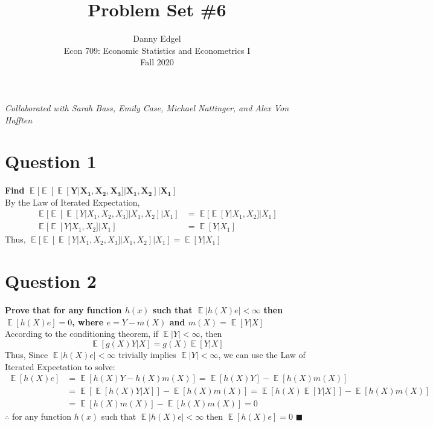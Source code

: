 \documentclass{article}
\DeclareMathOperator{\E}{\mathbb{E}}%
\begin{document}
\title{	Problem Set \#6 }
\author{ 	Danny Edgel 										\\ 
			Econ 709: Economic Statistics and Econometrics I	\\
			Fall 2020											\\
		}
\maketitle\thispagestyle{empty}


\noindent\textit{Collaborated with Sarah Bass, Emily Case, Michael Nattinger, and Alex Von Hafften}

\section*{Question 1}
\textbf{Find} $\mathbf{\E[\E[\E[Y|X_1,X_2,X_3]|X_1,X_2]|X_1]}$
\bigskip \\
By the Law of Iterated Expectation,
\begin{align*}
	\E[\E[\E[Y|X_1,X_2,X_3]|X_1,X_2]|X_1] &= \E[\E[Y|X_1,X_2]|X_1]	\\
	\E[\E[Y|X_1,X_2]|X_1] &= \E[Y|X_1]
\end{align*}
Thus, $\E[\E[\E[Y|X_1,X_2,X_3]|X_1,X_2]|X_1]=\E[Y|X_1]$



\section*{Question 2}
\textbf{Prove that for any function $h(x)$ such that $\E|h(X)e|<\infty$ then ${\E[h(X)e]=0}$, where $e=Y-m(X)$ and $m(X)=\E[Y|X]$} 
\bigskip \\
According to the conditioning theorem, if $\E|Y|<\infty$, then
\[
	\E[g(X)Y|X] = g(X)\E[Y|X]
\]
Thus, Since $\E|h(X)e|<\infty$ trivially implies $\E|Y|<\infty$, we can use the Law of Iterated Expectation to solve:
\begin{align*}
	\E[h(X)e] 	&= \E[h(X)Y-h(X)m(X)] = \E[h(X)Y] - \E[h(X)m(X)]	\\
				&= \E[\E[h(X)Y|X]] - \E[h(X)m(X)] = \E[h(X)\E[Y|X]] - \E[h(X)m(X)]	\\
				&= \E[h(X)m(X)] - \E[h(X)m(X)] = 0
\end{align*}
$\therefore$ for any function $h(x)$ such that $\E|h(X)e|<\infty$ then ${\E[h(X)e]=0}$ $\blacksquare$
\end{document}

